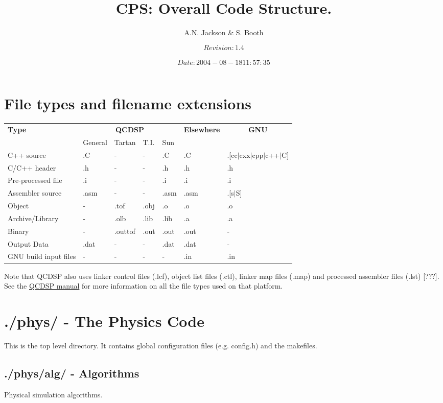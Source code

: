 \documentclass[12pt]{article}
\title{CPS: Overall Code Structure.}
\author{A.N. Jackson \& S. Booth}
\date{\mbox{\small $$Revision: 1.4 $$  $$Date: 2004-08-18 11:57:35 $$}}
\begin{document}
\maketitle

\tableofcontents
\newpage

\section{File types and filename extensions}
\begin{tabular}{|l|llll|l|l|}
\hline
{\bf Type} & \multicolumn{4}{c|}{{\bf QCDSP}} & {\bf Elsewhere} & \multicolumn{1}{c|}{\bf GNU}\\
     & General & Tartan & T.I. & Sun &  & \\
\hline
C++ source & .C & - & - & .C & .C & .[cc$|$cxx$|$cpp$|$c++$|$C] \\
C/C++ header & .h & - & - & .h & .h & .h\\ 
Pre-processed file & .i & - & - & .i & .i & .i\\
Assembler source & .asm & - & - & .asm & .asm & .[s$|$S] \\
Object & - & .tof & .obj & .o & .o & .o \\
Archive/Library & - & .olb & .lib & .lib & .a & .a \\
Binary & - & .outtof & .out & .out & .out & - \\
Output Data & .dat & - & - & .dat & .dat & - \\
GNU build input files & - & - & - & - & .in & .in \\
\hline
\end{tabular}

Note that QCDSP also uses linker control files (.lcf), object list files
(.ctl), linker map files (.map) and processed assembler files (.lst) [???].  
See the \href{../qcdsp/toplevel.html#tth_chAp6}{QCDSP manual}
for more information on all the file types used on that platform.


\section{./phys/ - The Physics Code}
This is the top level directory.  It contains global configuration files (e.g.
config.h) and the makefiles.

\subsection{./phys/alg/ - Algorithms}
\label{phys:alg}
Physical simulation algorithms.
\end{document}
